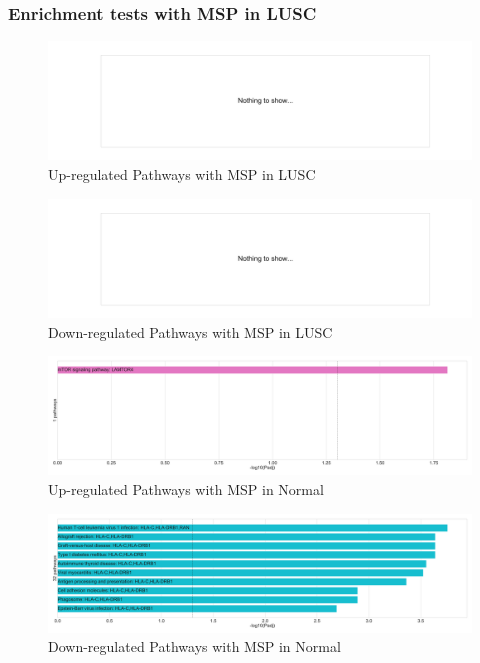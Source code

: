 \documentclass{beamer}
\begin{document}
    \begin{frame}[allowframebreaks]
        \frametitle{Enrichment tests with MSP in LUSC}
        \begin{figure}
            \includegraphics[width=0.7 \linewidth]{figures/DEG/Enrichment/STAR.FPKM.SQC.MSP-Median.Up.KEGG.pdf}
            \caption{Up-regulated Pathways with MSP in LUSC}
        \end{figure}

        \begin{figure}
            \includegraphics[width=0.7 \linewidth]{figures/DEG/Enrichment/STAR.FPKM.SQC.MSP-Median.Down.KEGG.pdf}
            \caption{Down-regulated Pathways with MSP in LUSC}
        \end{figure}

        \begin{figure}
            \includegraphics[width=0.7 \linewidth]{figures/DEG/Enrichment/STAR.FPKM.SQC.Normal.MSP-Median.Up.KEGG.pdf}
            \caption{Up-regulated Pathways with MSP in Normal}
        \end{figure}

        \begin{figure}
            \includegraphics[width=0.7 \linewidth]{figures/DEG/Enrichment/STAR.FPKM.SQC.Normal.MSP-Median.Down.KEGG.pdf}
            \caption{Down-regulated Pathways with MSP in Normal}
        \end{figure}


\end{frame}
\end{document}
